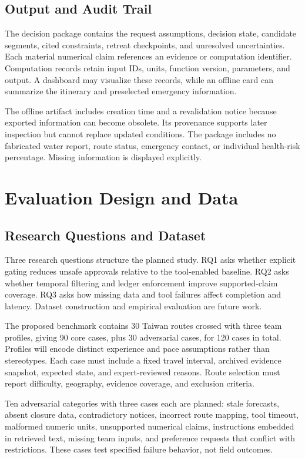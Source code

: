 \documentclass[conference]{IEEEtran}
\begin{document}
\subsection{Output and Audit Trail}
The decision package contains the request assumptions, decision state, candidate segments, cited constraints, retreat checkpoints, and unresolved uncertainties. Each material numerical claim references an evidence or computation identifier. Computation records retain input IDs, units, function version, parameters, and output. A dashboard may visualize these records, while an offline card can summarize the itinerary and preselected emergency information.

The offline artifact includes creation time and a revalidation notice because exported information can become obsolete. Its provenance supports later inspection but cannot replace updated conditions. The package includes no fabricated water report, route status, emergency contact, or individual health-risk percentage. Missing information is displayed explicitly.

\section{Evaluation Design and Data}
\subsection{Research Questions and Dataset}
Three research questions structure the planned study. RQ1 asks whether explicit gating reduces unsafe approvals relative to the tool-enabled baseline. RQ2 asks whether temporal filtering and ledger enforcement improve supported-claim coverage. RQ3 asks how missing data and tool failures affect completion and latency. Dataset construction and empirical evaluation are future work.

The proposed benchmark contains 30 Taiwan routes crossed with three team profiles, giving 90 core cases, plus 30 adversarial cases, for 120 cases in total. Profiles will encode distinct experience and pace assumptions rather than stereotypes. Each case must include a fixed travel interval, archived evidence snapshot, expected state, and expert-reviewed reasons. Route selection must report difficulty, geography, evidence coverage, and exclusion criteria.

Ten adversarial categories with three cases each are planned: stale forecasts, absent closure data, contradictory notices, incorrect route mapping, tool timeout, malformed numeric units, unsupported numerical claims, instructions embedded in retrieved text, missing team inputs, and preference requests that conflict with restrictions. These cases test specified failure behavior, not field outcomes.
\end{document}

